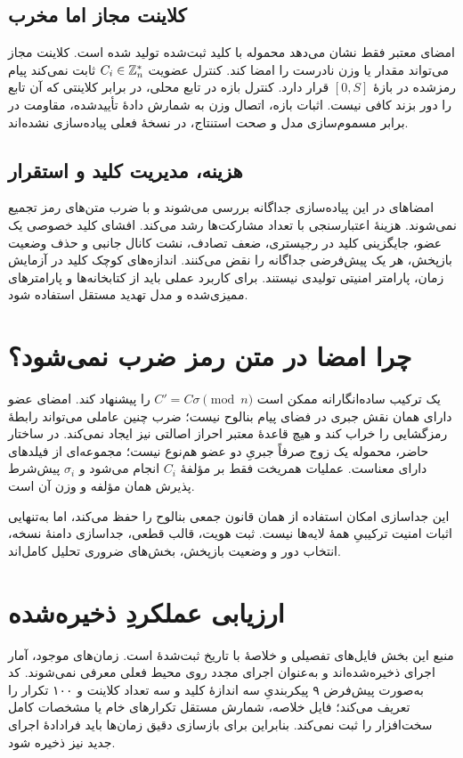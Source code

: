 \subsection{کلاینت مجاز اما مخرب}
امضای معتبر فقط نشان می‌دهد محموله با کلید ثبت‌شده تولید شده است. کلاینت مجاز می‌تواند مقدار یا وزن نادرست را امضا کند. کنترل عضویت $C_i\in\mathbb{Z}_n^*$ ثابت نمی‌کند پیام رمز‌شده در بازۀ $[0,S]$ قرار دارد. کنترل بازه در تابع محلی، در برابر کلاینتی که آن تابع را دور بزند کافی نیست. اثبات بازه، اتصال وزن به شمارش دادۀ تأییدشده، مقاومت در برابر مسموم‌سازی مدل و صحت استنتاج، در نسخۀ فعلی پیاده‌سازی نشده‌اند.

\subsection{هزینه، مدیریت کلید و استقرار}
امضاهای  در این پیاده‌سازی جداگانه بررسی می‌شوند و با ضرب متن‌های رمز تجمیع نمی‌شوند. هزینۀ اعتبارسنجی با تعداد مشارکت‌ها رشد می‌کند. افشای کلید خصوصی یک عضو، جایگزینی کلید در رجیستری، ضعف تصادف، نشت کانال جانبی و حذف وضعیت بازپخش، هر یک پیش‌فرضی جداگانه را نقض می‌کنند. اندازه‌های کوچک کلید در آزمایش زمان، پارامتر امنیتی تولیدی نیستند. برای کاربرد عملی باید از کتابخانه‌ها و پارامترهای ممیزی‌شده و مدل تهدید مستقل استفاده شود.

\section{چرا امضا در متن رمز ضرب نمی‌شود؟}
یک ترکیب ساده‌انگارانه ممکن است $C'=C\sigma\pmod n$ را پیشنهاد کند. امضای  عضو دارای همان نقش جبری در فضای پیام بنالوح نیست؛ ضرب چنین عاملی می‌تواند رابطۀ رمزگشایی را خراب کند و هیچ قاعدۀ معتبر احراز اصالتی نیز ایجاد نمی‌کند. در ساختار حاضر، محموله یک زوج صرفاً جبریِ دو عضو هم‌نوع نیست؛ مجموعه‌ای از فیلدهای دارای معناست. عملیات همریخت فقط بر مؤلفۀ $C_i$ انجام می‌شود و $\sigma_i$ پیش‌شرط پذیرش همان مؤلفه و وزن آن است.

این جداسازی امکان استفاده از همان قانون جمعی بنالوح را حفظ می‌کند، اما به‌تنهایی اثبات امنیت ترکیبیِ همۀ لایه‌ها نیست. ثبت هویت، قالب قطعی، جداسازی دامنۀ نسخه، انتخاب دور و وضعیت بازپخش، بخش‌های ضروری تحلیل کامل‌اند.

\section{ارزیابی عملکردِ ذخیره‌شده}
\label{sec:sbhe-performance}
منبع این بخش فایل‌های تفصیلی و خلاصۀ  با تاریخ ثبت‌شدۀ  است. زمان‌های موجود، آمار اجرای ذخیره‌شده‌اند و به‌عنوان اجرای مجدد روی محیط فعلی معرفی نمی‌شوند. کد  به‌صورت پیش‌فرض ۹ پیکربندیِ سه اندازۀ کلید و سه تعداد کلاینت و ۱۰۰ تکرار را تعریف می‌کند؛ فایل خلاصه، شمارش مستقل تکرارهای خام یا مشخصات کامل سخت‌افزار را ثبت نمی‌کند. بنابراین برای بازسازی دقیق زمان‌ها باید فرادادۀ اجرای جدید نیز ذخیره شود.

